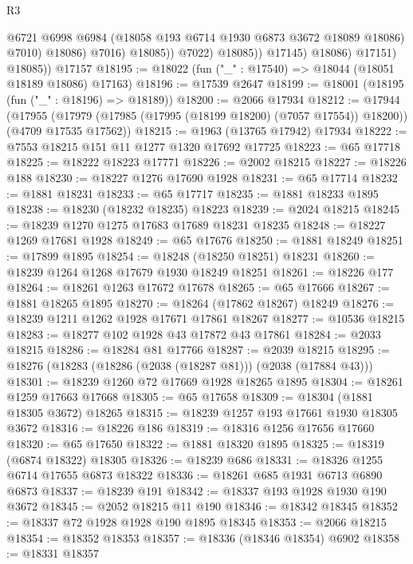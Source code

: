 \begin{lexlean}{R3}
\begin{coremodule}
                              @6721
                              @6998
                              @6984
                              (@18058 @193 @6714 @1930 @6873 @3672 @18089 @18086)
                              @7010)
                            @18086)
                          @7016)
                        @18085))
                    @7022)
                  @18085))
              @17145)
            @18086)
          @17151)
        @18085))
    @17157
@18195 := @18022 (fun ("_" : @17540) => @18044 (@18051 @18189 @18086) @17163)
@18196 := @17539 @2647
@18199 := @18001 (@18195 (fun ("_" : @18196) => @18189))
@18200 := @2066 @17934
@18212 := @17944
    (@17955 (@17979 (@17985 (@17995 (@18199 @18200) (@7057 @17554)) @18200)) (@4709 @17535 @17562))
@18215 := @1963 (@13765 @17942) @17934
@18222 := @7553 @18215 @151 @11 @1277 @1320 @17692 @17725
@18223 := @65 @17718
@18225 := @18222 @18223 @17771
@18226 := @2002 @18215
@18227 := @18226 @188
@18230 := @18227 @1276 @17690 @1928
@18231 := @65 @17714
@18232 := @1881 @18231
@18233 := @65 @17717
@18235 := @1881 @18233 @1895
@18238 := @18230 (@18232 @18235) @18223
@18239 := @2024 @18215
@18245 := @18239 @1270 @1275 @17683 @17689 @18231 @18235
@18248 := @18227 @1269 @17681 @1928
@18249 := @65 @17676
@18250 := @1881 @18249
@18251 := @17899 @1895
@18254 := @18248 (@18250 @18251) @18231
@18260 := @18239 @1264 @1268 @17679 @1930 @18249 @18251
@18261 := @18226 @177
@18264 := @18261 @1263 @17672 @17678
@18265 := @65 @17666
@18267 := @1881 @18265 @1895
@18270 := @18264 (@17862 @18267) @18249
@18276 := @18239 @1211 @1262 @1928 @17671 @17861 @18267
@18277 := @10536 @18215
@18283 := @18277 @102 @1928 @43 @17872 @43 @17861
@18284 := @2033 @18215
@18286 := @18284 @81 @17766
@18287 := @2039 @18215
@18295 := @18276 (@18283 (@18286 (@2038 (@18287 @81))) (@2038 (@17884 @43)))
@18301 := @18239 @1260 @72 @17669 @1928 @18265 @1895
@18304 := @18261 @1259 @17663 @17668
@18305 := @65 @17658
@18309 := @18304 (@1881 @18305 @3672) @18265
@18315 := @18239 @1257 @193 @17661 @1930 @18305 @3672
@18316 := @18226 @186
@18319 := @18316 @1256 @17656 @17660
@18320 := @65 @17650
@18322 := @1881 @18320 @1895
@18325 := @18319 (@6874 @18322) @18305
@18326 := @18239 @686
@18331 := @18326 @1255 @6714 @17655 @6873 @18322
@18336 := @18261 @685 @1931 @6713 @6890 @6873
@18337 := @18239 @191
@18342 := @18337 @193 @1928 @1930 @190 @3672
@18345 := @2052 @18215 @11 @190
@18346 := @18342 @18345
@18352 := @18337 @72 @1928 @1928 @190 @1895 @18345
@18353 := @2066 @18215
@18354 := @18352 @18353
@18357 := @18336 (@18346 @18354) @6902
@18358 := @18331 @18357

\end{coremodule}
\end{lexlean}
